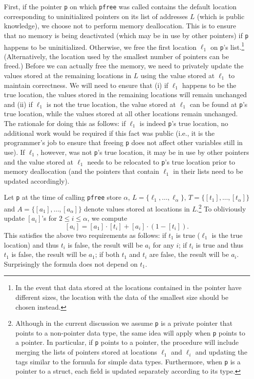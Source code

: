 \documentclass[11pt]{article}
\begin{document}
First, if the pointer \texttt{p} on which \texttt{pfree} was called contains
the default location corresponding to uninitialized pointers on its list of
addresses $L$ (which is public knowledge), we choose not to perform memory
deallocation. This is to ensure that no memory is being deactivated (which
may be in use by other pointers) if \texttt{p} happens to be uninitialized.
Otherwise, we free the first location $\ell_1$ on \texttt{p}'s
list.\footnote{In the event that data stored at the locations contained in
the pointer have different sizes, the location with the data of the smallest
size should be chosen instead.} (Alternatively, the location used by the
smallest number of pointers can be freed.) Before we can actually free the
memory, we need to privately update the values stored at the remaining
locations in $L$ using the value stored at $\ell_1$ to maintain correctness.
We will need to ensure that (i) if $\ell_1$ happens to be the true location,
the values stored in the remaining locations will remain unchanged and (ii)
if $\ell_1$ is not the true location, the value stored at $\ell_1$ can be
found at \texttt{p}'s true location, while the values stored at all other
locations remain unchanged.  The rationale for doing this as follows: if
$\ell_1$ is indeed \texttt{p}'s true location, no additional work would be
required if this fact was public (i.e., it is the programmer's job to ensure
that freeing \texttt{p} does not affect other variables still in use). If
$\ell_1$, however, was not \texttt{p}'s true location, it may be in use by
other pointers and the value stored at $\ell_1$ needs to be relocated to
\texttt{p}'s true location prior to memory deallocation (and the pointers
that contain $\ell_1$ in their lists need to be updated accordingly).

Let \texttt{p} at the time of calling \texttt{pfree} store $\alpha$, $L =
\{\ell_1, {\ldots}, \ell_{\alpha}\}$, $T = \{[t_1], {\ldots},
[t_{\alpha}]\}$ and $A = \{[a_1], {\ldots}, [a_{\alpha}]\}$ denote values
stored at locations in $L$.\footnote{Although in the current discussion we
assume \texttt{p} is a private pointer that points to a non-pointer data
type, the same idea will apply when \texttt{p} points to a pointer. In
particular, if \texttt{p} points to a pointer, the procedure will include
merging the lists of pointers stored at locations $\ell_1$ and $\ell_i$ and
updating the tags similar to the formula for simple data types. Furthermore,
when \texttt{p} is a pointer to a struct, each field is updated separately
according to its type.} To obliviously update $[a_i]$'s for $2 \le i \le
\alpha$, we compute $$[a_i] = [a_1] \cdot [t_i] + [a_i] \cdot (1-[t_i]).$$ 
This satisfies the above two requirements as follows: if $t_1$ is true
($\ell_1$ is the true location) and thus $t_i$ is false, the result will be
$a_i$ for any $i$; if $t_i$ is true and thus $t_1$ is false, the result will
be $a_1$; if both $t_1$ and $t_i$ are false, the result will be $a_i$.
Surprisingly the formula does not depend on $t_1$.
\end{document}
